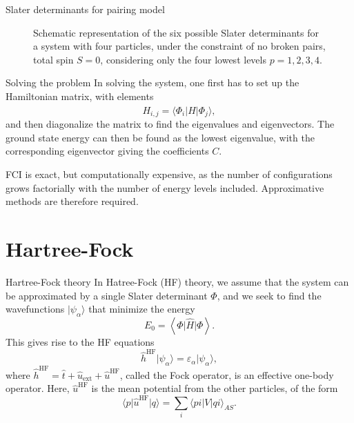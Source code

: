 \documentclass[UKenglish,aspectratio=169]{beamer}
\begin{document}
\begin{frame}{Slater determinants for pairing model}
    \begin{figure}[htbp]
        \centering
        
        \caption{
            Schematic representation of the six possible Slater
            determinants for a system with four particles, under the
            constraint of no broken pairs, total spin $S = 0$,
            considering only the four lowest levels $p = 1, 2, 3,
            4$.\label{fig:SDs}
        }
    \end{figure}
\end{frame}

\begin{frame}{Solving the problem}
    In solving the system, one first has to set up the Hamiltonian
    matrix, with elements
    \begin{equation}
        H_{i, j} = \langle \Phi_i \lvert \hat{H} \rvert \Phi_j \rangle,
    \end{equation}
    and then diagonalize the matrix to find the eigenvalues and eigenvectors.
    The ground state energy can then be found as the lowest
    eigenvalue, with the corresponding eigenvector giving the coefficients $C$.

    \bigskip

    FCI is exact, but computationally expensive, as the number of
    configurations grows factorially with the number of energy levels included.
    Approximative methods are therefore required.
\end{frame}

\section{Hartree-Fock}

\begin{frame}{Hartree-Fock theory}
    In Hatree-Fock (HF) theory, we assume that the system can be
    approximated by a single Slater determinant $\Phi$, and we seek
    to find the wavefunctions $\lvert \psi_\alpha \rangle$ that
    minimize the energy
    \begin{equation}
        E_0 = \left\langle \Phi \vert \hat{H} \vert \Phi \right\rangle.
    \end{equation}
    This gives rise to the HF equations
    \begin{equation}\label{eq:HF_equations}
        \hat{h}^\mathrm{HF} \lvert \psi_\alpha \rangle =
        \varepsilon_\alpha \lvert \psi_\alpha \rangle,
    \end{equation}
    where $\hat{h}^\mathrm{HF} = \hat{t} + \hat{u}_{\mathrm{ext}} +
    \hat{u}^\mathrm{HF}$, called the Fock operator, is an effective
    one-body operator.
    Here, $\hat{u}^\mathrm{HF}$ is the mean potential from the other
    particles, of the form
    \begin{equation}\label{eq:HFpotential}
        \langle p \vert \hat{u}^\mathrm{HF} \vert q \rangle =
        \sum_{i} \langle pi \vert V \vert qi \rangle_{AS}.
    \end{equation}
\end{frame}
\end{document}
